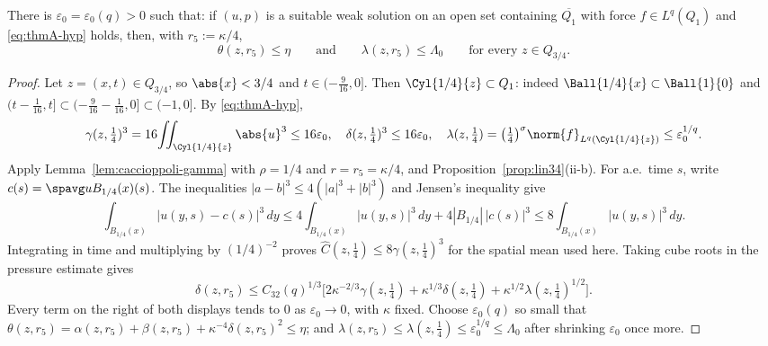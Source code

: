 \documentclass[11pt,reqno]{amsart}
\begin{document}
\begin{lemma}\label{lem:thmA-start}
There is $\varepsilon_{0}=\varepsilon_{0}(q)>0$ such that: if $(u,p)$ is a
suitable weak solution on an open set containing $\overline{Q_{1}}$ with force
$f\in L^{q}(Q_{1})$ and \eqref{eq:thmA-hyp} holds, then, with
$r_{5}:=\kappa/4$,
\[
  \theta(z,r_{5})\le\eta
  \qquad\text{and}\qquad
  \lambda(z,r_{5})\le\Lambda_{0}
  \qquad\text{for every }z\in Q_{3/4}.
\]
\end{lemma}

\begin{proof}
Let $z=(x,t)\in Q_{3/4}$, so $\abs{x}<3/4$ and $t\in(-\tfrac9{16},0]$. Then
$\Cyl{1/4}{z}\subset Q_{1}$: indeed $\Ball{1/4}{x}\subset\Ball{1}{0}$ and
$(t-\tfrac1{16},t]\subset(-\tfrac9{16}-\tfrac1{16},0]\subset(-1,0]$. By
\eqref{eq:thmA-hyp},
\[
  \gamma(z,\tfrac14)^{3}=16\!\iint_{\Cyl{1/4}{z}}\abs{u}^{3}\le16\varepsilon_{0},
  \quad
  \delta(z,\tfrac14)^{3}\le16\varepsilon_{0},
  \quad
  \lambda(z,\tfrac14)=\bigl(\tfrac14\bigr)^{\sigma}\norm{f}_{L^{q}(\Cyl{1/4}{z})}
    \le\varepsilon_{0}^{1/q}.
\]
Apply Lemma~\ref{lem:caccioppoli-gamma} with $\rho=1/4$ and $r=r_{5}=\kappa/4$,
and Proposition~\ref{prop:lin34}(ii-b). For a.e.\ time $s$, write
$c(s)=\spavg u{B_{1/4}(x)}(s)$. The inequalities
$|a-b|^3\le4(|a|^3+|b|^3)$ and Jensen's inequality give
\[
 \int_{B_{1/4}(x)}|u(y,s)-c(s)|^3\,dy
 \le4\int_{B_{1/4}(x)}|u(y,s)|^3\,dy+4|B_{1/4}|\,|c(s)|^3
 \le8\int_{B_{1/4}(x)}|u(y,s)|^3\,dy.
\]
Integrating in time and multiplying by $(1/4)^{-2}$ proves
$\widehat C(z,\tfrac14)\le8\gamma(z,\tfrac14)^3$ for the spatial mean
used here. Taking cube roots in the pressure estimate gives
\[
  \delta(z,r_{5})\le C_{32}(q)^{1/3}\bigl[2\kappa^{-2/3}\gamma(z,\tfrac14)
    +\kappa^{1/3}\delta(z,\tfrac14)+\kappa^{1/2}\lambda(z,\tfrac14)^{1/2}\bigr].
\]
Every term on the right of both displays tends to $0$ as
$\varepsilon_{0}\to0$, with $\kappa$ fixed. Choose $\varepsilon_{0}(q)$ so small
that $\theta(z,r_{5})=\alpha(z,r_{5})+\beta(z,r_{5})+\kappa^{-4}\delta(z,r_{5})^{2}
\le\eta$; and $\lambda(z,r_{5})\le\lambda(z,\tfrac14)\le\varepsilon_{0}^{1/q}
\le\Lambda_{0}$ after shrinking $\varepsilon_{0}$ once more.
\end{proof}
\end{document}
